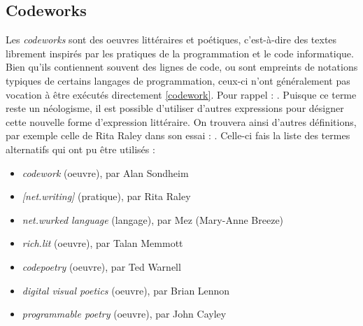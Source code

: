 \documentclass[12pt]{article} %
\begin{document}
\newpage
\subsection{Codeworks}

Les \textit{codeworks} sont des oeuvres littéraires et poétiques, c'est-à-dire des textes librement inspirés par les pratiques de la programmation et le code informatique. Bien qu'ils contiennent souvent des lignes de code, ou sont empreints de notations typiques de certains langages de programmation, ceux-ci n'ont généralement pas vocation à être exécutés directement \ref{codework}. Pour rappel :  \cite{ELO-ContentByKeyword}. Puisque ce terme reste un néologisme, il est possible d'utiliser d'autres expressions pour désigner cette nouvelle forme d'expression littéraire. On trouvera ainsi d'autres définitions, par exemple celle de Rita Raley dans son essai  :  \cite{RRita-codework}. Celle-ci fais la liste des termes alternatifs qui ont pu être utilisés :
\begin{itemize}
    \item \textit{codework} (oeuvre), par Alan Sondheim
    \item \textit{[net.writing]} (pratique), par Rita Raley
    \item \textit{net.wurked language} (langage), par Mez (Mary-Anne Breeze)
    \item \textit{rich.lit} (oeuvre), par Talan Memmott
    \item \textit{codepoetry} (oeuvre), par Ted Warnell
    \item \textit{digital visual poetics} (oeuvre), par Brian Lennon
    \item \textit{programmable poetry} (oeuvre), par John Cayley
\end{itemize}
\end{document}
